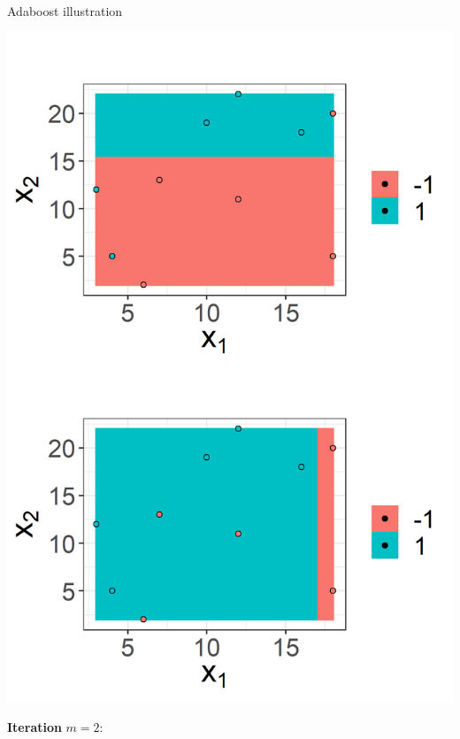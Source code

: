 \begin{vbframe}{Adaboost illustration}
\begin{footnotesize}
\end{footnotesize}


\framebreak

\begin{minipage}[c]{0.4\textwidth}
  \includegraphics[width = \textwidth]{figure/adaboost_viz_mlr3_2.png}
\end{minipage}%
\begin{minipage}[c]{0.05\textwidth}
  \phantom{foo}
\end{minipage}%
\begin{minipage}[c]{0.6\textwidth}
  \begin{footnotesize}
  \textbf{Iteration} $m = 2$:
  \begin{itemize}

\end{itemize}
\end{footnotesize}
\end{minipage}
\end{vbframe}
